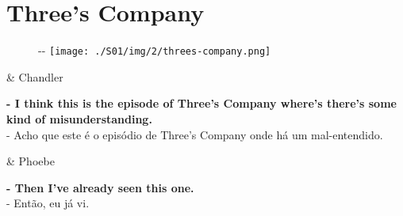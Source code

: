 \hypertarget{threes-company}{%
\section{Three's Company}\label{threes-company}}

\begin{figure}[!ht]
  \begin{adjustwidth}{-\oddsidemargin-1in}{-\rightmargin}
    \centering
    \texttt{[image: ./S01/img/2/threes-company.png]}
  \end{adjustwidth}
\end{figure}

\begin{tcolorbox}[enhanced,center upper,
    drop fuzzy shadow southeast, boxrule=0.3pt,
    lower separated=false,
    colframe=black!30!dialogoBorder,colback=white]
\begin{minipage}[c]{0.16\linewidth}
   & \centering \scriptsize{Chandler}
\end{minipage}
\hfill
\begin{minipage}[c]{0.8\linewidth}
  \textbf{- I think this is the episode of Three's Company where's there's some kind of misunderstanding.}\\
  - Acho que este é o episódio de Three's Company onde há um mal-entendido.
\end{minipage}

\medskip
\begin{minipage}[c]{0.16\linewidth}
   & \centering \scriptsize{Phoebe}
\end{minipage}
\hfill
\begin{minipage}[c]{0.8\linewidth}
  \textbf{- Then I've already seen this one.}\\
  - Então, eu já vi.
\end{minipage}
\end{tcolorbox}

